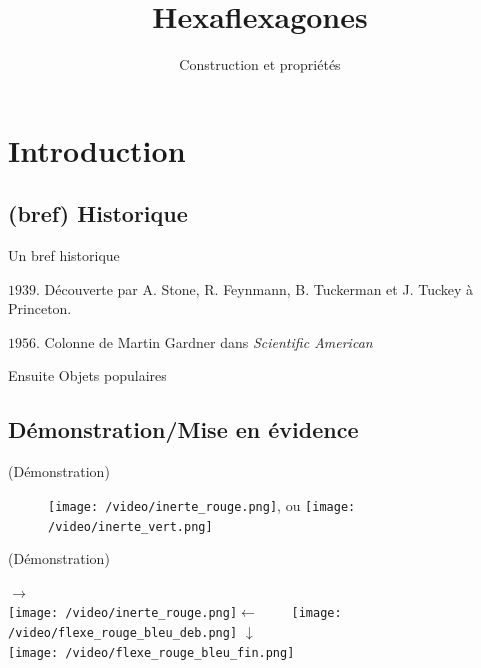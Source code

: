 \documentclass[french,xcolor=dvipsnames]{beamer}
\begin{document}
	\title{Hexaflexagones}
	\subtitle{Construction et propriétés}
	\frame[plain]{\maketitle}
	

\AtBeginSection
{
}

	
	\section{Introduction}
		\subsection{(bref) Historique}
		\begin{frame}{Un bref historique}

			\begin{list}{Intro}{}
				\item[$\textit{1939}$.] Découverte  par A. Stone, R. Feynmann, B. Tuckerman et J. Tuckey à Princeton.
				\item[$\textit{1956}$.]Colonne de Martin Gardner dans \textit{Scientific American}
				\item[Ensuite] Objets populaires 
			\end{list}
		\end{frame}
		
		\subsection{Démonstration/Mise en évidence}
		\begin{frame}{(Démonstration)}
		\begin{center}
			\begin{figure}
			\texttt{[image: /video/inerte\_rouge.png]}, ou
			\texttt{[image: /video/inerte\_vert.png]}
			\end{figure}
		\end{center}
		\end{frame}
		
		\begin{frame}{(Démonstration)}
		\begin{center}
		\Large{$\longrightarrow$}\\
			\texttt{[image: /video/inerte\_rouge.png]}$\leftarrow\qquad$
			\texttt{[image: /video/flexe\_rouge\_bleu\_deb.png]} \Large{$\downarrow$}\\
			\texttt{[image: /video/flexe\_rouge\_bleu\_fin.png]}
		\end{center}
		\end{frame}
		
\end{document}
